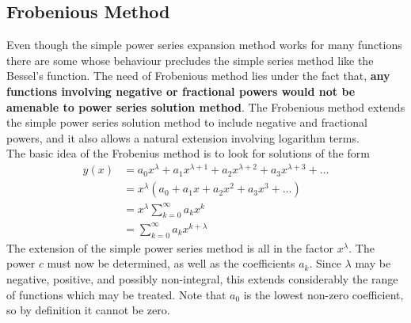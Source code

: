 \subsection{Frobenious Method}
Even though the simple power series expansion method works for many functions there are some whose behaviour  precludes the simple series method like the Bessel's function. The need of Frobenious method  lies under the fact that, \textbf{any functions involving negative or fractional powers would not be amenable to power series solution method}. The Frobenious method extends the simple power series solution method to include negative and fractional powers, and it also allows a natural extension involving logarithm terms.\\
The basic idea of the Frobenius method is to look for solutions of the form
\begin{align*}
y(x) &=a_{0} x^{\lambda}+a_{1} x^{\lambda+1}+a_{2} x^{\lambda+2}+a_{3} x^{\lambda+3}+\ldots \\
&=x^{\lambda}\left(a_{0}+a_{1} x+a_{2} x^{2}+a_{3} x^{3}+\ldots\right) \\
&=x^{\lambda} \sum_{k=0}^{\infty} a_{k} x^{k} \\
&= \sum_{k=0}^{\infty} a_{k} x^{k+\lambda}
\end{align*}
The extension of the simple power series method is all in the factor $x^{\lambda}$. The power $c$ must now be determined, as well as the coefficients $a_{k}$. Since $\lambda$ may be negative, positive, and possibly non-integral, this extends considerably the range of functions which may be treated. Note that $a_{0}$ is the lowest non-zero coefficient, so by definition it cannot be zero.

